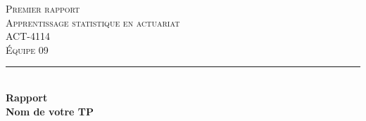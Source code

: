 \documentclass[
]{article}
\author{}
\date{\vspace{-2.5em}}
\begin{document}
%

\begin{titlepage}

\newcommand{\HRule}{\rule{\linewidth}{0.5mm}} %

\center %
\textsc{\LARGE Premier rapport}\\[1.0cm] %
\textsc{\Large Apprentissage statistique en actuariat}\\[0.2cm] %
\textsc{\large ACT-4114}\\[0.7cm] %
\textsc{\large Équipe 09}\\[0.7cm] %


\HRule \\[0.4cm]
{ \Large \bfseries Rapport}\\[0.20cm] { \huge \bfseries Nom de votre TP}\\[0.20cm]


\end{titlepage}
\end{document}
